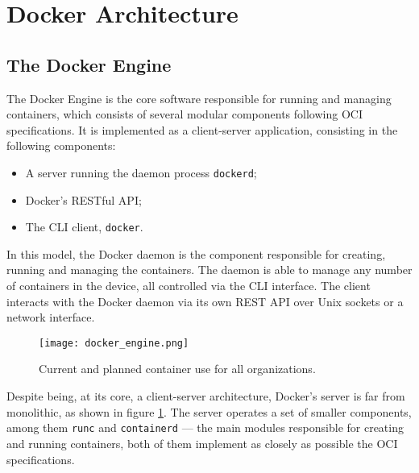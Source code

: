 \section{Docker Architecture}
\label{sec::arch}


\subsection{The Docker Engine}
\label{ssec::arch:engine}
The Docker Engine is the core software responsible for running and managing containers, which consists of several modular components following \ac{OCI} specifications\cite{Docker-engine}. It is implemented as a client-server application, consisting in the following components:

\begin{itemize}
    \item A server running the daemon process \texttt{dockerd};
    \item Docker's \acs{REST}ful \ac{API};
    \item The \ac{CLI} client, \texttt{docker}.
\end{itemize}

In this model, the Docker daemon is the component responsible for creating, running and managing the containers. The daemon is able to manage any number of containers in the device, all controlled via the \ac{CLI} interface. The client interacts with the Docker daemon via its own \ac{REST} \ac{API} over Unix sockets or a network interface\cite{Poulton2020-ju}.

\begin{figure}[!htb]
    \centering
    \texttt{[image: docker\_engine.png]}
    \caption{Current and planned container use for all organizations.}
    \label{fig::docker-engine-server}
\end{figure}

Despite being, at its core, a client-server architecture, Docker's server is far from monolithic, as shown in figure \ref{fig::docker-engine-server}. The server operates a set of smaller components, among them \texttt{runc} and \texttt{containerd} --- the main modules responsible for creating and running containers, both of them implement as closely as possible the \ac{OCI} specifications\cite{Poulton2020-ju}.

